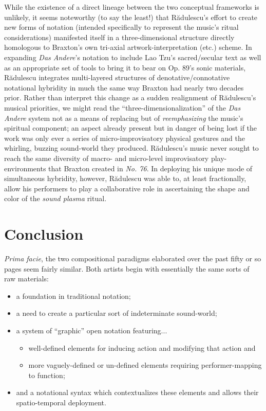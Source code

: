    While the existence of a direct lineage between the two conceptual frameworks is unlikely, it seems noteworthy (to say the least!) that R\u{a}dulescu's effort to create new forms of notation (intended specifically to represent the music's ritual considerations) manifested itself in a three-dimensional structure directly homologous to Braxton's own tri-axial artwork-interpretation (etc.) scheme. In expanding \textit{Das Andere}'s notation to include Lao Tzu's sacred/secular text as well as an appropriate set of tools to bring it to bear on Op. 89's sonic materials, R\u{a}dulescu integrates multi-layered structures of denotative/connotative notational hybridity in much the same way Braxton had nearly two decades prior. Rather than interpret this change as a sudden realignment of R\u{a}dulescu's musical priorities, we might read the ``three-dimensionalization'' of the \textit{Das Andere} system not as a means of replacing but of \textit{reemphasizing} the music's spiritual component; an aspect already present but in danger of being lost if the work was only ever a series of micro-improvisatory physical gestures and the whirling, buzzing sound-world they produced. R\u{a}dulescu's music never sought to reach the same diversity of macro- and micro-level improvisatory play-environments that Braxton created in \textit{No. 76}. In deploying his unique mode of simultaneous hybridity, however, R\u{a}dulescu was able to, at least fractionally, allow his performers to play a collaborative role in ascertaining the shape and color of the \textit{sound plasma} ritual.
    
    \section{Conclusion}

    \textit{Prima facie}, the two compositional paradigms elaborated over the past fifty or so pages seem fairly similar. Both artists begin with essentially the same sorts of raw materials:

    \begin{smallquote}
    \begin{itemize}
        \item a foundation in traditional notation;
        \item a need to create a particular sort of indeterminate sound-world;
        \item a system of ``graphic'' open notation featuring...
        \begin{itemize}
            \item well-defined elements for inducing action and modifying that action and
            \item more vaguely-defined or un-defined elements requiring performer-mapping to function;
        \end{itemize}
        \item and a notational syntax which contextualizes these elements and allows their spatio-temporal deployment.
    \end{itemize}
    \end{smallquote}

